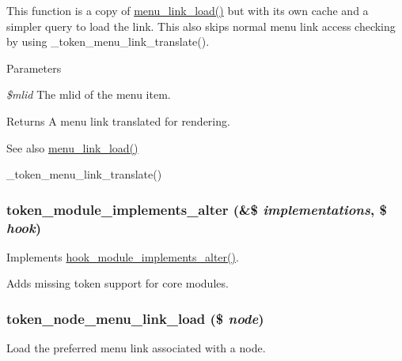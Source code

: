This function is a copy of \hyperlink{group__menu_gac2b338fa3a449c826661aade7a7d486e}{menu\_\-link\_\-load()} but with its own cache and a simpler query to load the link. This also skips normal menu link access checking by using \_\-token\_\-menu\_\-link\_\-translate().


\begin{DoxyParams}{Parameters}
\item[{\em \$mlid}]The mlid of the menu item.\end{DoxyParams}
\begin{DoxyReturn}{Returns}
A menu link translated for rendering.
\end{DoxyReturn}
\begin{DoxySeeAlso}{See also}
\hyperlink{group__menu_gac2b338fa3a449c826661aade7a7d486e}{menu\_\-link\_\-load()} 

\_\-token\_\-menu\_\-link\_\-translate() 
\end{DoxySeeAlso}
\hypertarget{token_8module_aa9de071c35f0534b7d316f25bea3c6f1}{
\subsubsection[{token\_\-module\_\-implements\_\-alter}]{\setlength{\rightskip}{0pt plus 5cm}token\_\-module\_\-implements\_\-alter (\&\$ {\em implementations}, \/  \$ {\em hook})}}
\label{token_8module_aa9de071c35f0534b7d316f25bea3c6f1}
Implements \hyperlink{group__hooks_gab71c322e6487a3b99bd04c5b9adb13f6}{hook\_\-module\_\-implements\_\-alter()}.

Adds missing token support for core modules. \hypertarget{token_8module_a549ee65529db4c066963f05fad4bbc15}{
\subsubsection[{token\_\-node\_\-menu\_\-link\_\-load}]{\setlength{\rightskip}{0pt plus 5cm}token\_\-node\_\-menu\_\-link\_\-load (\$ {\em node})}}
\label{token_8module_a549ee65529db4c066963f05fad4bbc15}
Load the preferred menu link associated with a node.


